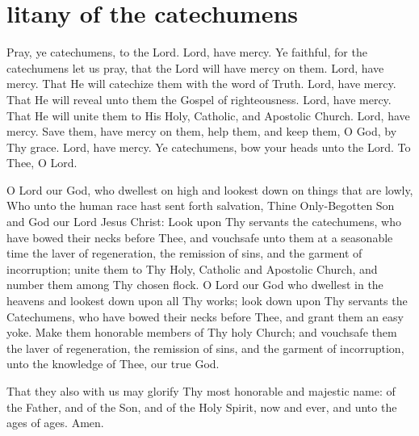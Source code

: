 \section{litany of the catechumens}

\begin{liturgicaltext}
    \deacon Pray, ye catechumens, to the Lord.
    \choir Lord, have mercy.
    \deacon Ye faithful, for the catechumens let us pray, that the Lord will have mercy on them.
    \choir Lord, have mercy.
    \deacon That He will catechize them with the word of Truth.
    \choir Lord, have mercy.
    \deacon That He will reveal unto them the Gospel of righteousness.
    \choir Lord, have mercy.
    \deacon That He will unite them to His Holy, Catholic, and Apostolic Church.
    \choir Lord, have mercy.
    \deacon Save them, have mercy on them, help them, and keep them, O God, by Thy grace.
    \choir Lord, have mercy.
    \deacon Ye catechumens, bow your heads unto the Lord.
    \choirsemisecret To Thee, O Lord. 
\end{liturgicaltext}
\begin{semisecret}
    \begin{secretprayerbasil}
        O Lord our God, who dwellest on high and lookest down on things that are lowly, Who unto the human race hast sent forth salvation, Thine Only-Begotten Son and God our Lord Jesus Christ: Look upon Thy servants the catechumens, who have bowed their necks before Thee, and vouchsafe unto them at a seasonable time the laver of regeneration, the remission of sins, and the garment of incorruption; unite them to Thy Holy, Catholic and Apostolic Church, and number them among Thy chosen flock.
        \switchcolumn
        O Lord our God who dwellest in the heavens and lookest down upon all Thy works; look down upon Thy servants the Catechumens, who have bowed their necks before Thee, and grant them an easy yoke. Make them honorable members of Thy holy Church; and vouchsafe them the laver of regeneration, the remission of sins, and the garment of incorruption, unto the knowledge of Thee, our true God.
    \end{secretprayerbasil}
\end{semisecret}
\begin{liturgicaltext}
    \priest That they also with us may glorify Thy most honorable and majestic name: of the Father, and of the Son, and of the Holy Spirit, now and ever, and unto the ages of ages.
    \choir Amen.
\end{liturgicaltext}